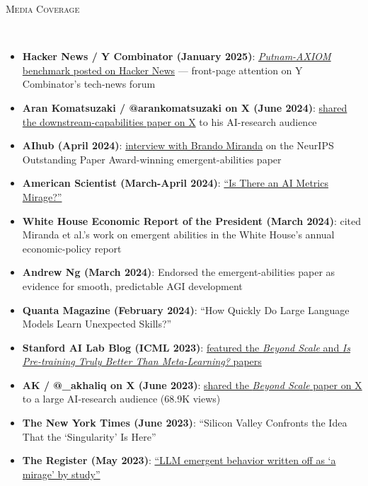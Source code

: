 \documentclass{article}
\newenvironment{changemargin}[2]{%
  \begin{list}{}{%
    \setlength{\topsep}{0pt}%
    \setlength{\leftmargin}{#1}%
    \setlength{\rightmargin}{#2}%
    \setlength{\listparindent}{\parindent}%
    \setlength{\itemindent}{\parindent}%
    \setlength{\parsep}{\parskip}%
  }%
  \item[]}{\end{list}
}
\newcommand{\lineover}{
	\begin{changemargin}{-0.05in}{-0.05in}
		\vspace*{-8pt}
		\hrulefill \\
		\vspace*{-2pt}
	\end{changemargin}
}
\newcommand{\header}[1]{
	\begin{changemargin}{-0.5in}{-0.5in}
		\scshape{#1}\\
  	\lineover
	\end{changemargin}
	\nopagebreak[4]    %
}
\newenvironment{body} {
		\vspace*{-16pt}
		\begin{changemargin}{-0.25in}{-0.5in}
	  }
		{\end{changemargin}\vspace{8pt plus 12pt}
	}
\begin{document}
\header{Media Coverage}
\begin{body}
\vspace{12pt}
\begin{itemize} \itemsep -2pt
    \item \textbf{Hacker News / Y Combinator (January 2025)}: \href{https://news.ycombinator.com/item?id=42565606}{\textit{Putnam-AXIOM} benchmark posted on Hacker News} --- front-page attention on Y Combinator's tech-news forum
    \item \textbf{Aran Komatsuzaki / @arankomatsuzaki on X (June 2024)}: \href{https://x.com/arankomatsuzaki/status/1799976398331011173}{shared the downstream-capabilities paper on X} to his AI-research audience
    \item \textbf{AIhub (April 2024)}: \href{https://aihub.org/2024/04/25/are-emergent-abilities-of-large-language-models-a-mirage-interview-with-brando-miranda/}{interview with Brando Miranda} on the NeurIPS Outstanding Paper Award-winning emergent-abilities paper
    \item \textbf{American Scientist (March-April 2024)}: \href{https://www.americanscientist.org/article/an-education-in-irrationality}{``Is There an AI Metrics Mirage?''}
    \item \textbf{White House Economic Report of the President (March 2024)}: cited Miranda et al.'s work on emergent abilities in the White House's annual economic-policy report
    \item \textbf{Andrew Ng (March 2024)}: Endorsed the emergent-abilities paper as evidence for smooth, predictable AGI development
    \item \textbf{Quanta Magazine (February 2024)}: ``How Quickly Do Large Language Models Learn Unexpected Skills?''
    \item \textbf{Stanford AI Lab Blog (ICML 2023)}: \href{https://ai.stanford.edu/blog/icml-2023/}{featured the \textit{Beyond Scale} and \textit{Is Pre-training Truly Better Than Meta-Learning?} papers}
    \item \textbf{AK / @\_akhaliq on X (June 2023)}: \href{https://x.com/_akhaliq/status/1673507375515594766}{shared the \textit{Beyond Scale} paper on X} to a large AI-research audience (68.9K views)
    \item \textbf{The New York Times (June 2023)}: ``Silicon Valley Confronts the Idea That the `Singularity' Is Here''
    \item \textbf{The Register (May 2023)}: \href{https://www.theregister.com/software/2023/05/16/llm-emergent-behavior-written-off-as-a-mirage-by-study/655184}{``LLM emergent behavior written off as `a mirage' by study''}

\end{itemize}
\end{body}
\end{document}
